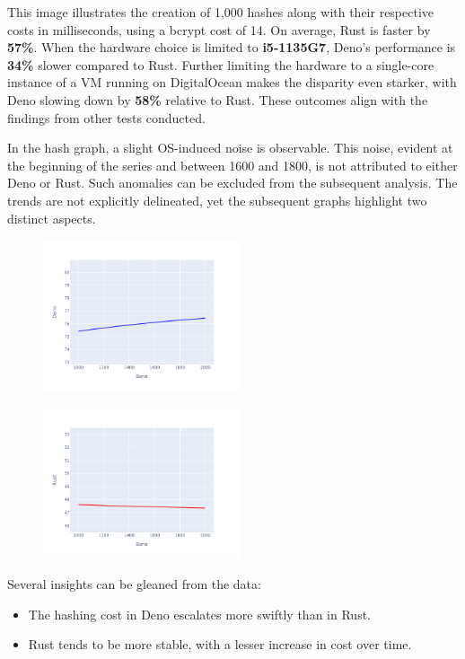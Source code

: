 \documentclass[10pt,journal,compsoc]{IEEEtran}
\begin{document}
This image illustrates the creation of 1,000 hashes along with their respective costs in milliseconds, using a bcrypt cost of 14. On average, Rust is faster by \textbf{57\%}. When the hardware choice is limited to \textbf{i5-1135G7}, Deno's performance is \textbf{34\%} slower compared to Rust. Further limiting the hardware to a single-core instance of a VM running on DigitalOcean makes the disparity even starker, with Deno slowing down by \textbf{58\%} relative to Rust. These outcomes align with the findings from other tests conducted.

In the hash graph, a slight OS-induced noise is observable. This noise, evident at the beginning of the series and between 1600 and 1800, is not attributed to either Deno or Rust. Such anomalies can be excluded from the subsequent analysis.
The trends are not explicitly delineated, yet the subsequent graphs highlight two distinct aspects.

\begin{figure}[H]
    \centering
    \includegraphics[width=0.52\textwidth]{trend_hash_deno}
\end{figure}

\begin{figure}[H]
    \centering
    \includegraphics[width=0.52\textwidth]{images/trend_hash_rust.png}
\end{figure}

Several insights can be gleaned from the data:
\begin{itemize}
    \item The hashing cost in Deno escalates more swiftly than in Rust.
    \item Rust tends to be more stable, with a lesser increase in cost over time.
\end{itemize}
\end{document}
